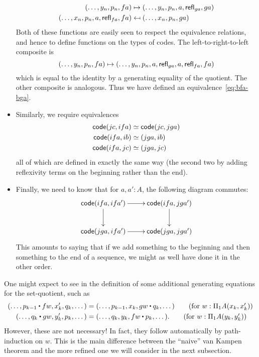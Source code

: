 \begin{itemize}
  \begin{align*}
    (\dots, y_n, p_n,fa) &\mapsto (\dots,y_n,p_n,a,\mathsf{refl}_{ga},ga)\\
    (\dots, x_n, p_n, a, \mathsf{refl}_{fa}, fa) &\mapsfrom (\dots, x_n, p_n, ga)
  \end{align*}
  Both of these functions are easily seen to respect the equivalence relations, and hence to define functions on the types of codes.
  The left-to-right-to-left composite is
  \[ (\dots, y_n, p_n,fa) \mapsto
  (\dots,y_n,p_n,a,\mathsf{refl}_{ga},a,\mathsf{refl}_{fa},fa)
  \]
  which is equal to the identity by a generating equality of the quotient.
  The other composite is analogous.
  Thus we have defined an equivalence~\eqref{eq:bfa-bga}.
\item Similarly, we require equivalences
  \begin{align*}
    \mathsf{code}(jc,ifa) &\simeq \mathsf{code}(jc,jga)\\
    \mathsf{code}(ifa,ib)&\simeq (jga,ib)\\
    \mathsf{code}(ifa,jc)&\simeq (jga,jc)
  \end{align*}
  all of which are defined in exactly the same way (the second two by adding reflexivity terms on the beginning rather than the end).
\item Finally, we need to know that for $a,a':A$, the following diagram commutes:
  \begin{equation}\label{eq:bfa-bga-comm}
  \vcenter{\xymatrix{
      \code(ifa,ifa') \ar[r]\ar[d] &
      \code(ifa,jga')\ar[d]\\
      \code(jga,ifa')\ar[r] &
      \code(jga,jga')
      }}
  \end{equation}
  This amounts to saying that if we add something to the beginning and then something to the end of a sequence, we might as well have done it in the other order.
\end{itemize}

\begin{rmk}\label{rmk:naive}
  One might expect to see in the definition of \code some additional generating equations for the set-quotient, such as
  \begin{align*}
    (\dots, p_{k-1} \ct fw, x_{k}', q_{k}, \dots) &=
    (\dots, p_{k-1}, x_{k}, gw \ct q_{k}, \dots)
    \tag{for $w:\Pi_1A(x_{k},x_{k}')$}\\
    (\dots, q_k \ct gw, y_k', p_k, \dots) &=
    (\dots, q_k, y_k, fw \ct p_k, \dots).
    \tag{for $w:\Pi_1A(y_k, y_k')$}
  \end{align*}
  However, these are not necessary!
  In fact, they follow automatically by path-induction on $w$.
  This is the main difference between the ``naive'' van Kampen theorem and the more refined one we will consider in the next subsection.
\end{rmk}

